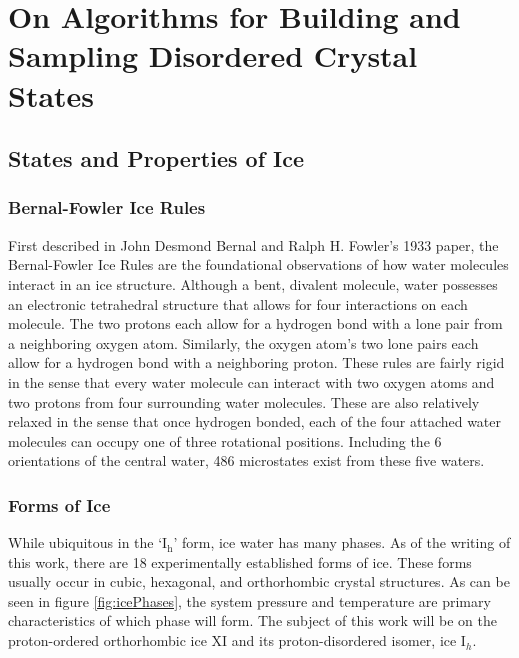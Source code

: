 \chapter{On Algorithms for Building and Sampling Disordered Crystal States}
\label{ch:iceXI}

\section{States and Properties of Ice}


\subsection{Bernal-Fowler Ice Rules}

First described in John Desmond Bernal and Ralph H. Fowler's 1933 paper, the Bernal-Fowler Ice Rules are the foundational observations of how water molecules interact in an ice structure.
Although a bent, divalent molecule, water possesses an electronic tetrahedral structure that allows for four interactions on each molecule.
The two protons each allow for a hydrogen bond with a lone pair from a neighboring oxygen atom.
Similarly, the oxygen atom's two lone pairs each allow for a hydrogen bond with a neighboring proton. 
These rules are fairly rigid in the sense that every water molecule can interact with two oxygen atoms and two protons from four surrounding water molecules.
These are also relatively relaxed in the sense that once hydrogen bonded, each of the four attached water molecules can occupy one of three rotational positions. 
Including the 6 orientations of the central water, 486 microstates exist from these five waters.

\subsection{Forms of Ice}

While ubiquitous in the `I$_{\mathrm{h}}$' form, ice water has many phases.
As of the writing of this work, there are 18 experimentally established forms of ice. 
These forms usually occur in cubic, hexagonal, and orthorhombic crystal structures.
As can be seen in figure \ref{fig:icePhases}, the system pressure and temperature are primary characteristics of which phase will form.
The subject of this work will be on the proton-ordered orthorhombic ice XI and its proton-disordered isomer, ice I$_{h}$.

